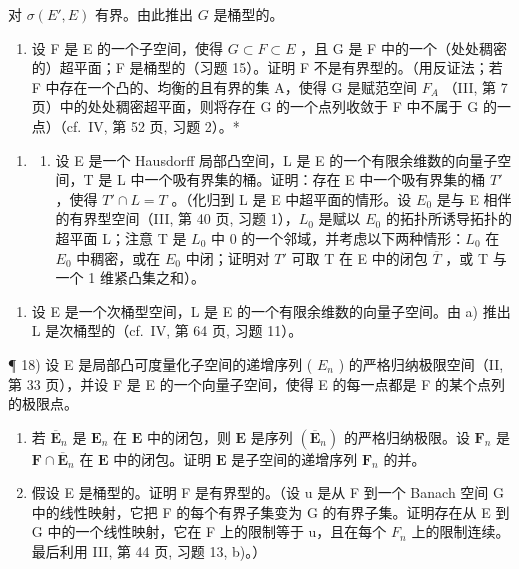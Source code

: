对 \(\sigma(E', E)\) 有界。由此推出 \(G\) 是桶型的。

\begin{enumerate}
\def\labelenumi{\alph{enumi})}
\setcounter{enumi}{1}
\tightlist
\item
  设 F 是 E 的一个子空间，使得 \(G \subset F \subset E\) ，且 G 是 F 中的一个（处处稠密的）超平面；F 是桶型的（习题 15）。证明 F 不是有界型的。（用反证法；若 F 中存在一个凸的、均衡的且有界的集 A，使得 G 是赋范空间 \(F_{A}\) （III, 第 7 页）中的处处稠密超平面，则将存在 G 的一个点列收敛于 F 中不属于 G 的一点）（cf.~IV, 第 52 页, 习题 2）。*
\end{enumerate}

\begin{enumerate}
\def\labelenumi{\arabic{enumi})}
\setcounter{enumi}{16}
\tightlist
\item
  \begin{enumerate}
  \def\labelenumii{\alph{enumii})}
  \tightlist
  \item
    设 E 是一个 Hausdorff 局部凸空间，L 是 E 的一个有限余维数的向量子空间，T 是 L 中一个吸有界集的桶。证明：存在 E 中一个吸有界集的桶 \(T'\) ，使得 \(T' \cap L = T\) 。（化归到 L 是 E 中超平面的情形。设 \(E_{0}\) 是与 E 相伴的有界型空间（III, 第 40 页, 习题 1），\(L_{0}\) 是赋以 \(E_{0}\) 的拓扑所诱导拓扑的超平面 L；注意 T 是 \(L_{0}\) 中 0 的一个邻域，并考虑以下两种情形：\(L_{0}\) 在 \(E_{0}\) 中稠密，或在 \(E_{0}\) 中闭；证明对 \(T'\) 可取 T 在 E 中的闭包 \(\overline{T}\) ，或 T 与一个 1 维紧凸集之和）。
  \end{enumerate}
\end{enumerate}

\begin{enumerate}
\def\labelenumi{\alph{enumi})}
\setcounter{enumi}{1}
\tightlist
\item
  设 E 是一个次桶型空间，L 是 E 的一个有限余维数的向量子空间。由 a) 推出 L 是次桶型的（cf.~IV, 第 64 页, 习题 11）。
\end{enumerate}

¶ 18) 设 E 是局部凸可度量化子空间的递增序列 ( \(E_{n}\) ) 的严格归纳极限空间（II, 第 33 页），并设 F 是 E 的一个向量子空间，使得 E 的每一点都是 F 的某个点列的极限点。

\begin{enumerate}
\def\labelenumi{\alph{enumi})}
\item
  若 \(\overline{\mathbf{E}}_n\) 是 \(\mathbf{E}_n\) 在 \(\mathbf{E}\) 中的闭包，则 \(\mathbf{E}\) 是序列 \((\overline{\mathbf{E}}_n)\) 的严格归纳极限。设 \(\mathbf{F}_n\) 是 \(\mathbf{F} \cap \overline{\mathbf{E}}_n\) 在 \(\mathbf{E}\) 中的闭包。证明 \(\mathbf{E}\) 是子空间的递增序列 \(\mathbf{F}_n\) 的并。
\item
  假设 E 是桶型的。证明 F 是有界型的。（设 u 是从 F 到一个 Banach 空间 G 中的线性映射，它把 F 的每个有界子集变为 G 的有界子集。证明存在从 E 到 G 中的一个线性映射，它在 F 上的限制等于 u，且在每个 \(F_{n}\) 上的限制连续。最后利用 III, 第 44 页, 习题 13, b)。）
\end{enumerate}

